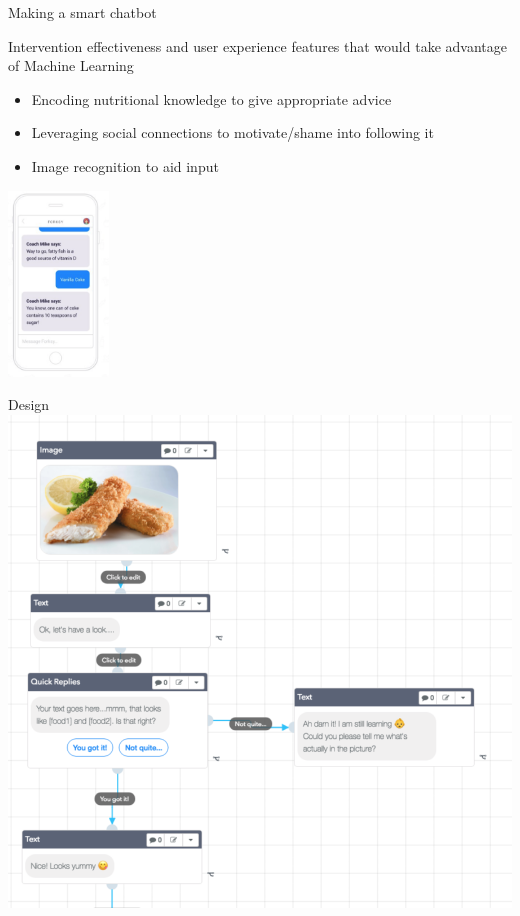 \documentclass[landscape]{infslides}
\begin{document}
\begin{slide}{Making a smart chatbot}
    \begin{multicols}{2}
        Intervention effectiveness and user experience features that would take advantage of Machine Learning
        \begin{itemize} 
            \item Encoding nutritional knowledge to give appropriate advice
            \item Leveraging social connections to motivate/shame into following it
            \item Image recognition to aid input
        \end{itemize} 
        \includegraphics[width=0.2\textwidth]{Forksy.png}
    \end{multicols}
\end{slide}
\begin{slide}{Design}
    \centering
    \includegraphics[height=0.85\textheight]{Botmock.png}
\end{slide}
\end{document}
